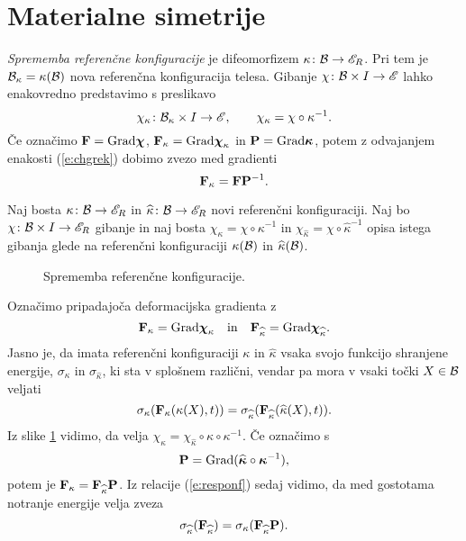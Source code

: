 \section{Materialne simetrije}


\emph{Sprememba referenčne konfiguracije} je difeomorfizem $\kappa\colon\mathcal B\to\mathscr E_R$.
Pri tem je $\mathcal B_{\kappa}=\kappa(\mathcal B)$ nova referenčna konfiguracija telesa. Gibanje
$\chi\colon\mathcal B\times I\to\mathscr E$ lahko enakovredno predstavimo s preslikavo
\begin{equation} \label{e:chgrek}
	\chi_{\kappa}\colon\mathcal B_{\kappa}\times I\to\mathscr E, \qquad
	\chi_{\kappa}=\chi\circ\kappa^{-1}.
\end{equation}
Če označimo $\mathbf F=\mathrm{Grad}\boldsymbol \chi$, $\mathbf F_{\kappa}=\mathrm{Grad}\boldsymbol \chi_{\kappa}$
in $\mathbf P=\mathrm{Grad}\boldsymbol \kappa$, potem z odvajanjem enakosti (\ref{e:chgrek})
dobimo zvezo med gradienti
\[
	\mathbf F_{\kappa}=\mathbf F\mathbf P^{-1}.
\]

Naj bosta $\kappa\colon\mathcal B\to\mathscr E_R$ in $\widehat{\kappa}\colon\mathcal B\to\mathscr E_R$ novi referenčni konfiguraciji.
Naj bo $\chi\colon\mathcal B\times I\to\mathscr E_R$ gibanje in naj bosta
$\chi_{\kappa}=\chi\circ\kappa^{-1}$ in $\chi_{\widehat{\kappa}}=\chi\circ\widehat{\kappa}^{-1}$
opisa istega gibanja glede na referenčni konfiguraciji $\kappa(\mathcal B)$ in $\widehat{\kappa}(\mathcal B)$.
\begin{figure}[h] \begin{center}
	
	\caption{Sprememba referenčne konfiguracije.}
	\label{pic:diagram}
\end{center} \end{figure}
Označimo pripadajoča deformacijska gradienta z
\[
	\mathbf F_{\kappa}=\mathrm{Grad}\boldsymbol \chi_{\kappa}\quad \mathrm{in}\quad
	\mathbf F_{\widehat{\kappa}}=\mathrm{Grad}\boldsymbol \chi_{\widehat{\kappa}}.
\]
Jasno je, da imata referenčni konfiguraciji $\kappa$ in $\widehat{\kappa}$ vsaka
svojo funkcijo shranjene energije, $\sigma_{\kappa}$ in $\sigma_{\widehat{\kappa}}$,
ki sta v splošnem različni, vendar pa mora v vsaki točki $X\in\mathcal B$ veljati
\begin{equation} \label{e:responf}
	\sigma_{\kappa}(\mathbf F_{\kappa}(\kappa(X),t))
	=\sigma_{\widehat{\kappa}}(\mathbf F_{\widehat{\kappa}}(\widehat{\kappa}(X),t)).
\end{equation}
Iz slike \ref{pic:diagram} vidimo, da velja $\chi_{\kappa}=\chi_{\widehat{\kappa}}\circ\widehat{\kappa}\circ\kappa^{-1}$.
Če označimo s
\begin{equation} \label{e:pupa}
	\mathbf P=\mathrm{Grad}(\widehat{\boldsymbol \kappa}\circ\boldsymbol \kappa^{-1}),
\end{equation}
potem je $\mathbf F_{\kappa}=\mathbf F_{\widehat{\kappa}}\mathbf P$. Iz relacije (\ref{e:responf})
sedaj vidimo, da med gostotama notranje energije velja zveza
\begin{equation} \label{e:dolgnoc}
	\sigma_{\widehat{\kappa}}(\mathbf F_{\widehat{\kappa}})
	=\sigma_{\kappa}(\mathbf F_{\widehat{\kappa}}\mathbf P).
\end{equation}

